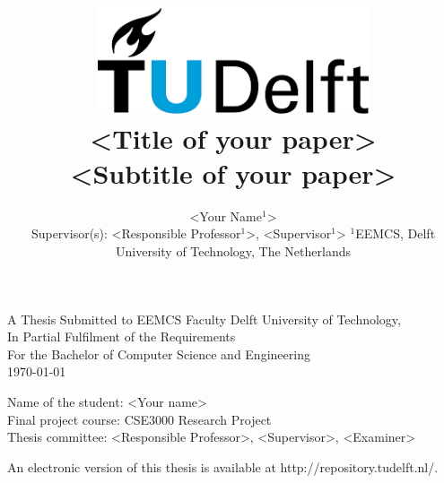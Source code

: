 \title{
    \includegraphics[width=8cm, keepaspectratio]{tudelftlogo.png}\\
    \vspace*{2cm}
    \textbf{
        \textless Title of your paper\textgreater\\
        {\large \textless Subtitle of your paper\textgreater}
    }\\
    \vspace*{1cm}
}

\author{
    \textless Your Name$^1$\textgreater\\
    \hfill \break
    Supervisor(s): \textless Responsible Professor$^1$\textgreater, \textless Supervisor$^1$\textgreater
    \affiliations
    {\large 
        \hfill \break
        $^1$EEMCS, Delft University of Technology, The Netherlands
    }\\
}

\maketitle

\let\clearpagebackup\clearpage
\renewcommand{\clearpage}{ }

\onecolumn

\vspace*{2cm}
\begin{center}
    A Thesis Submitted to EEMCS Faculty Delft University of Technology,\\
    In Partial Fulfilment of the Requirements\\
    For the Bachelor of Computer Science and Engineering\\
    \today
\end{center}

\vspace*{3cm}

\noindent
{\small
Name of the student: \textless Your name\textgreater\\
Final project course: CSE3000 Research Project\\
Thesis committee: \textless Responsible Professor\textgreater, \textless Supervisor\textgreater, \textless Examiner\textgreater\\
}
\vfill

\begin{center}
    An electronic version of this thesis is available at http://repository.tudelft.nl/.
\end{center}

\twocolumn
\let\clearpage\clearpagebackup  
\clearpage